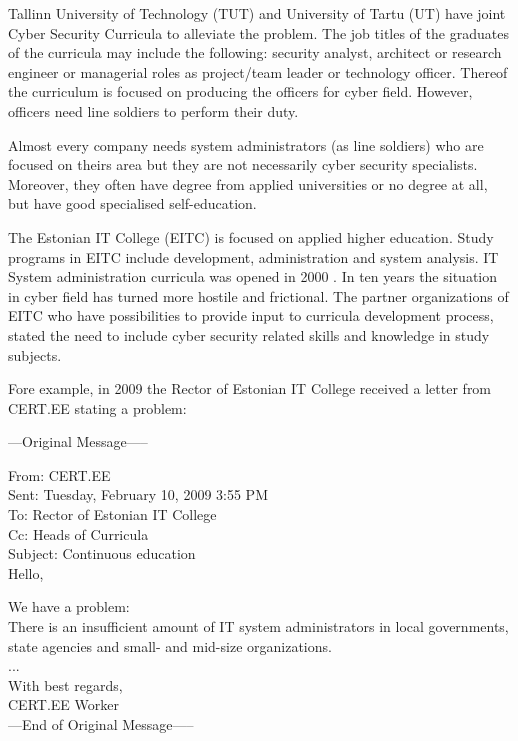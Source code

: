 Tallinn University of Technology (\gls{TUT}) and University of Tartu (\gls{UT}) have joint Cyber Security Curricula to alleviate the problem. The job titles of the graduates of the curricula may include the following: security analyst, architect or research engineer or managerial roles as project/team leader or technology officer. \citep{TUT_UT_curriculum} Thereof the curriculum is focused on producing the officers for cyber field. 
However, officers need line soldiers to perform their duty.

Almost every company needs system administrators (as line soldiers) who are focused on theirs area but they are not necessarily cyber security specialists. Moreover, they often have degree from applied universities or no degree at all, but have good specialised self-education.

The Estonian IT College (\gls{EITC}) is focused on applied higher education. Study programs in \gls{EITC} include development, administration and system analysis. IT System administration curricula was opened in 2000 \citep{website:EITC_history}. In ten years the situation in cyber field has turned more hostile and frictional. The partner organizations of \gls{EITC} who have possibilities to provide input to curricula development process, stated the need to include cyber security related skills and knowledge in study subjects.

Fore example, in 2009 the Rector of Estonian IT College received a letter from \gls{CERT.EE} stating a problem:\par

{
\begin{spacing}{1} 
\scriptsize
---Original Message-----

From: CERT.EE\\
Sent: Tuesday, February 10, 2009 3:55 PM\\
To: Rector of Estonian IT College\\
Cc: Heads of Curricula \\
Subject: Continuous education\\
Hello,

We have a problem:\\
There is an insufficient amount of IT system administrators in local governments, state agencies and small- and mid-size organizations.\\
...\\
With best regards,\\
CERT.EE Worker\\
---End of Original Message-----
\end{spacing}
}

